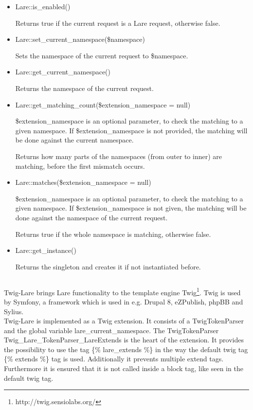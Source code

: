 \begin{itemize}
\item Lare::is\_enabled()

Returns true if the current request is a Lare request, otherwise false.
\item Lare::set\_current\_namespace(\$namespace)

Sets the namespace of the current request to \$namespace.
\item Lare::get\_current\_namespace()

Returns the namespace of the current request.
\item Lare::get\_matching\_count(\$extension\_namespace = null)

\$extension\_namespace is an optional parameter, to check the matching to a given namespace. If \$extension\_namespace is not provided, the matching will be done against the current namespace.

Returns how many parts of the namespaces (from outer to inner) are matching, before the first mismatch occurs.
\item Lare::matches(\$extension\_namespace = null)

\$extension\_namespace is an optional parameter, to check the matching to a given namespace. If \$extension\_namespace is not given, the matching will be done against the namespace of the current request.

Returns true if the whole namespace is matching, otherwise false.
\item Lare::get\_instance()

Returns the \lare{} singleton and creates it if not instantiated before.
\end{itemize}

\subsection{\twigLare{}}
Twig-Lare brings Lare functionality to the template engine Twig\footnote{http://twig.sensiolabs.org/}.
Twig is used by Symfony, a framework which is used in e.g. Drupal 8, eZPublish, phpBB and Sylius.
\\
Twig-Lare is implemented as a Twig extension.
It consists of a TwigTokenParser and the global variable lare\_current\_namespace.
The TwigTokenParser
\\
Twig\_Lare\_TokenParser\_LareExtends is the heart of the extension.
It provides the possibility to use the tag \{\% lare\_extends \%\} in the way the default twig tag \{\% extends \%\} tag is used.
Additionally it prevents multiple extend tags.
Furthermore it is ensured that it is not called inside a block tag, like seen in the default twig tag.

